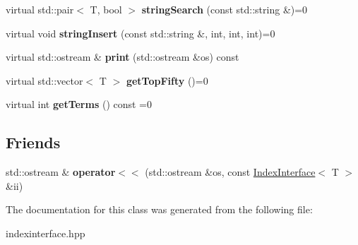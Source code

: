 \begin{DoxyCompactItemize}
\mbox{\label{classIndexInterface_a9fcec55df60d05560f9da1aa26b13fd9}} 
virtual std\+::pair$<$ T, bool $>$ {\bfseries string\+Search} (const std\+::string \&)=0
\item 
\mbox{\label{classIndexInterface_a6251d1376bd55e4db20d8129119d75d7}} 
virtual void {\bfseries string\+Insert} (const std\+::string \&, int, int, int)=0
\item 
\mbox{\label{classIndexInterface_a4897cb2ced701b463dd7d195e92ce3b4}} 
virtual std\+::ostream \& {\bfseries print} (std\+::ostream \&os) const
\item 
\mbox{\label{classIndexInterface_a41fe3e677c672edb96328a236d85dcc5}} 
virtual std\+::vector$<$ T $>$ {\bfseries get\+Top\+Fifty} ()=0
\item 
\mbox{\label{classIndexInterface_ad5de04ae546cb61f76ea4e3c9bf595f8}} 
virtual int {\bfseries get\+Terms} () const =0
\end{DoxyCompactItemize}
\subsection*{Friends}
\begin{DoxyCompactItemize}
\item 
\mbox{\label{classIndexInterface_a4576a590014d3c4b541cd772fa3efec6}} 
std\+::ostream \& {\bfseries operator$<$$<$} (std\+::ostream \&os, const \mbox{\hyperlink{classIndexInterface}{Index\+Interface}}$<$ T $>$ \&ii)
\end{DoxyCompactItemize}


The documentation for this class was generated from the following file\+:\begin{DoxyCompactItemize}
\item 
indexinterface.\+hpp\end{DoxyCompactItemize}
